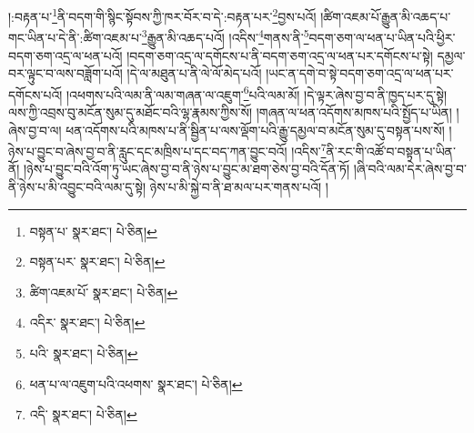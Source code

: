 །:བརྟན་པ་\footnote{བསྟན་པ་  སྣར་ཐང་།  པེ་ཅིན། }ནི་བདག་གི་སྙིང་སྟོབས་ཀྱི་ཁར་བོར་བ་དེ་:བརྟན་པར་\footnote{བསྟན་པར་  སྣར་ཐང་།  པེ་ཅིན། }བྱས་པའོ། །ཚིག་འཇམ་པོ་རྒྱུན་མི་འཆད་པ་གང་ཡིན་པ་དེ་ནི་:ཚིག་འཇམ་པ་\footnote{ཚིག་འཇམ་པོ་  སྣར་ཐང་།  པེ་ཅིན། }རྒྱུན་མི་འཆད་པའོ། །འདིས་\footnote{འདིར་  སྣར་ཐང་།  པེ་ཅིན། }གནས་ནི་\footnote{པའི་  སྣར་ཐང་།  པེ་ཅིན། }བདག་ཅག་ལ་ཕན་པ་ཡིན་པའི་ཕྱིར་བདག་ཅག་འདྲ་ལ་ཕན་པའོ། །བདག་ཅག་འདྲ་ལ་དགོངས་པ་ནི་བདག་ཅག་འདྲ་ལ་ཕན་པར་དགོངས་པ་སྟེ། དམྱལ་བར་ལྟུང་བ་ལས་བཟློག་པའོ། །དེ་ལ་མཐུན་པ་ནི་ལེ་ལོ་མེད་པའོ། །ཡང་ན་དགེ་བ་སྟེ་བདག་ཅག་འདྲ་ལ་ཕན་པར་དགོངས་པའོ། །འཕགས་པའི་ལམ་ནི་ལམ་གཞན་ལ་འཇུག་\footnote{ཕན་པ་ལ་འཇུག་པའི་འཕགས་  སྣར་ཐང་།  པེ་ཅིན། }པའི་ལམ་མོ། །དེ་ལྟར་ཞེས་བྱ་བ་ནི་ཁྱད་པར་དུ་སྟེ། ལས་ཀྱི་འབྲས་བུ་མངོན་སུམ་དུ་མཐོང་བའི་ལྷ་རྣམས་ཀྱིས་སོ། །གཞན་ལ་ཕན་འདོགས་མཁས་པའི་སྤྱོད་པ་ཡིན། །ཞེས་བྱ་བ་ལ། ཕན་འདོགས་པའི་མཁས་པ་ནི་སྦྱིན་པ་ལས་ལྡོག་པའི་རྒྱུ་དམྱལ་བ་མངོན་སུམ་དུ་བསྟན་པས་སོ། །ཉེས་པ་བྱུང་བ་ཞེས་བྱ་བ་ནི་རླུང་དང་མཁྲིས་པ་དང་བད་ཀན་བྱུང་བའོ། །འདིས་\footnote{འདི་  སྣར་ཐང་།  པེ་ཅིན། }ནི་རང་གི་འཚོ་བ་བསྟན་པ་ཡིན་ནོ། །ཉེས་པ་བྱུང་བའི་འོག་ཏུ་ཡང་ཞེས་བྱ་བ་ནི་ཉེས་པ་བྱུང་མ་ཐག་ཅེས་བྱ་བའི་དོན་ཏོ། །ཞི་བའི་ལམ་དེར་ཞེས་བྱ་བ་ནི་ཉེས་པ་མི་འབྱུང་བའི་ལམ་དུ་སྟེ། ཉེས་པ་མི་སྐྱེ་བ་ནི་ཐ་མལ་པར་གནས་པའོ། །
